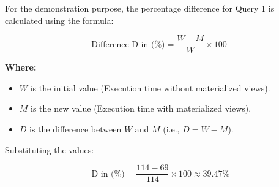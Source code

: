 For the demonstration purpose, the percentage difference for Query 1 is calculated using the formula:

\begin{equation}
\text{Difference D in  (\%)} = \frac{W - M}{W} \times 100
\end{equation}

\noindent \textbf{Where:}
\begin{itemize}
    \item \( W \) is the initial value (Execution time without materialized views).
    \item \( M \) is the new value (Execution time with materialized views).
    \item \( D \) is the difference between \( W \) and \( M \) (i.e., \( D = W - M \)).
\end{itemize}

Substituting the values:

\[
\text{ D in (\%)} = \frac{114 - 69}{114} \times 100 \approx 39.47\%
\]